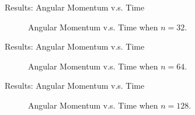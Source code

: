 \documentclass[10pt, xcolor = svgnames, aspectratio=43]{beamer} %
\begin{document}
\begin{frame}{Results: Angular Momentum v.s. Time}
\begin{figure}
\caption{Angular Momentum v.s. Time when $n = 32$.}
\label{A-T32}
\end{figure}
\end{frame}

\begin{frame}{Results: Angular Momentum v.s. Time}
\begin{figure}
\caption{Angular Momentum v.s. Time when $n = 64$.}
\label{A-T64}
\end{figure}
\end{frame}

\begin{frame}{Results: Angular Momentum v.s. Time}
\begin{figure}
\caption{Angular Momentum v.s. Time when $n = 128$.}
\label{A-T128}
\end{figure}
\end{frame}
\end{document}
